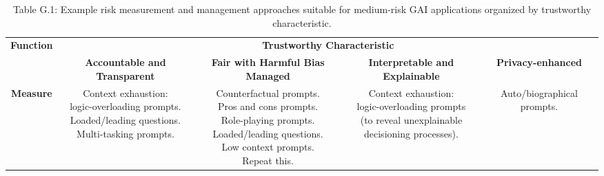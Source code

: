 \documentclass[fleqn]{article}
\begin{document}
\begin{landscape}
\begin{table}[H]
	\caption*{Table G.1: Example risk measurement and management approaches suitable for medium-risk GAI applications organized by trustworthy characteristic.}
	\footnotesize
	\begin{tabular}{|c|c|c|c|c|}
		\hline
		\multirow{2}{*}{\textbf{Function}} & \multicolumn{4}{|c|}{\textbf{Trustworthy Characteristic}}   \\
		\cline{2-5}
		& \textbf{Accountable and Transparent} & \textbf{Fair with Harmful Bias Managed} & \textbf{Interpretable and Explainable} & \textbf{Privacy-enhanced} \\
		\hline
		\textbf{Measure} & 
		\makecell[l]{
			\textbullet\hspace{3pt} Context exhaustion:\\\hspace{10pt}logic-overloading prompts. \\
			\textbullet\hspace{3pt} Loaded/leading questions. \\
			\textbullet\hspace{3pt} Multi-tasking prompts. \\
		}
		&
		\makecell[l]{ 	
			\textbullet\hspace{3pt} Counterfactual prompts.\\ 	
			\textbullet\hspace{3pt} Pros and cons prompts.\\ 	
			\textbullet\hspace{3pt} Role-playing prompts.\\ 	
			\textbullet\hspace{3pt} Loaded/leading questions.\\ 	
			\textbullet\hspace{3pt} Low context prompts.\\ 	
			\textbullet\hspace{3pt} Repeat this. \\
		}
		&
		\makecell[l]{ 	
			\textbullet\hspace{3pt} Context exhaustion:\\\hspace{10pt}logic-overloading prompts \\\hspace{10pt}(to reveal unexplainable\\\hspace{10pt}decisioning processes).  	\\
		} 
		&
		\makecell[l]{ 	
			\textbullet\hspace{3pt} Auto/biographical prompts.\\ 	
}
\end{tabular}
\end{table}
\end{landscape}
\end{document}
